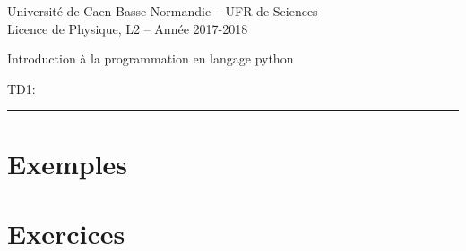\documentclass[11pt]{article}
\newcommand{\HRule}{\rule{\linewidth}{0.5mm}}
\newcommand{\hm}{\fontfamily{phv}\fontseries{m}\selectfont}
\begin{document}
%
\thispagestyle{empty}
%
\hm
\begin{center}
Universit\'e de Caen Basse-Normandie -- UFR de Sciences \\
Licence de Physique, L2 -- Ann\'ee 2017-2018 \\
\end{center}

\vspace{5mm}
\centerline{\sc\Large Introduction \`a la programmation en langage python}
\vspace{5mm}
\centerline{\sc\Large TD1: }
\vspace{5mm}

\noindent
\HRule
\vspace{5mm}
\rm
%
%
\section{Exemples}
%



\section{Exercices}
%

\end{document}

